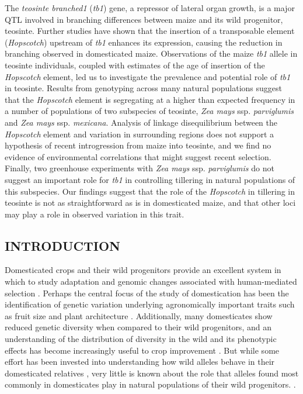 \documentclass[11pt]{article}
\begin{document}
\begin{linenumbers}
\begin{flushleft}
The \emph{teosinte branched1} (\emph{tb1}) gene, a repressor of lateral organ growth, is a major QTL involved in branching differences between maize and its wild progenitor, teosinte. Further studies have shown that the insertion of a transposable element (\emph{Hopscotch}) upstream of \emph{tb1} enhances its expression, causing the reduction in branching observed in domesticated maize. Observations of the maize \emph{tb1} allele in teosinte individuals, coupled with estimates of the age of insertion of the \emph{Hopscotch} element, led us to investigate the prevalence and potential role of \emph{tb1} in teosinte. Results from genotyping across many natural populations suggest that the \emph{Hopscotch} element is segregating at a higher than expected frequency in a number of populations of two subspecies of teosinte, \emph{Zea mays} ssp. \emph{parviglumis} and \emph{Zea mays} ssp. \emph{mexicana}. Analysis of linkage disequilibrium between the \emph{Hopscotch} element and variation in surrounding regions does not support a hypothesis of recent introgression from maize into teosinte, and we find no evidence of environmental correlations that might suggest recent selection. Finally, two greenhouse experiments with \emph{Zea mays} ssp. \emph{parviglumis} do not suggest an important role for \emph{tb1} in controlling tillering in natural populations of this subspecies. Our findings suggest that the role of the \emph{Hopscotch} in tillering in teosinte is not as straightforward as is in domesticated maize, and that other loci may play a role in observed variation in this trait.  

\clearpage

\begin{centering}
\section*{INTRODUCTION}
\end{centering}


Domesticated crops and their wild progenitors provide an excellent system in which to study adaptation and genomic changes associated with human-mediated selection \citep{Ross-Ibarra2007}. Perhaps the central focus of the study of domestication has been the identification of genetic variation underlying agronomically important traits such as fruit size and plant architecture \citep{OlsenGross2010}. Additionally, many domesticates show reduced genetic diversity when compared to their wild progenitors, and an understanding of the distribution of diversity in the wild and its phenotypic effects has become increasingly useful to crop improvement \citep{KovachMcCouch2008}. But while some effort has been invested into understanding how wild alleles behave in their domesticated relatives \citep{Bai2007}, very little is known about the role that alleles found most commonly in domesticates play in natural populations of their wild progenitors.
\citep{Whitton1997}.


\end{flushleft}
\end{linenumbers}
\end{document}
